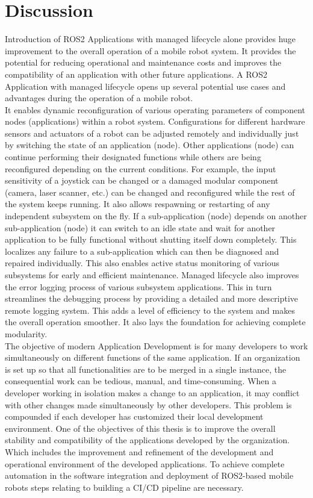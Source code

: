 \chapter{Discussion}
\label{Discussion}

Introduction of ROS2 Applications with managed lifecycle alone provides huge improvement to the overall operation of a mobile robot system. It provides the potential for reducing operational and maintenance costs and improves the compatibility of an application with other future applications. A ROS2 Application with managed lifecycle opens up several potential use cases and advantages during the operation of a mobile robot.
\\

It enables dynamic reconfiguration of various operating parameters of component nodes (applications) within a robot system. Configurations for different hardware sensors and actuators of a robot can be adjusted remotely and individually just by switching the state of an application (node). Other applications (node) can continue performing their designated functions while others are being reconfigured depending on the current conditions. For example, the input sensitivity of a joystick can be changed or a damaged modular component (camera, laser scanner, etc.) can be changed and reconfigured while the rest of the system keeps running. It also allows respawning or restarting of any independent subsystem on the fly. If a sub-application (node) depends on another sub-application (node) it can switch to an idle state and wait for another application to be fully functional without shutting itself down completely. This localizes any failure to a sub-application which can then be diagnosed and repaired individually. This also enables active status monitoring of various subsystems for early and efficient maintenance. Managed lifecycle also improves the error logging process of various subsystem applications. This in turn streamlines the debugging process by providing a detailed and more descriptive remote logging system. This adds a level of efficiency to the system and makes the overall operation smoother. It also lays the foundation for achieving complete modularity.
\\

The objective of modern Application Development is for many developers to work simultaneously on different functions of the same application. If an organization is set up so that all functionalities are to be merged in a single instance, the consequential work can be tedious, manual, and time-consuming. When a developer working in isolation makes a change to an application, it may conflict with other changes made simultaneously by other developers. This problem is compounded if each developer has customized their local development environment. One of the objectives of this thesis is to improve the overall stability and compatibility of the applications developed by the organization. Which includes the improvement and refinement of the development and operational environment of the developed applications. To achieve complete automation in the software integration and deployment of ROS2-based mobile robots steps relating to building a CI/CD pipeline are necessary. 
\\

